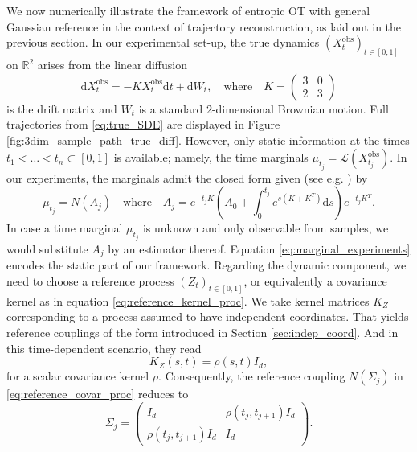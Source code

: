 \documentclass[]{article}
\newcommand{\diffd}{\mathrm{d}}
\DeclareMathOperator{\obs}{obs}
\numberwithin{equation}{section}
\theoremstyle{plain}
\begin{document}
{We now numerically illustrate the framework of entropic OT with general Gaussian reference in the context of trajectory reconstruction, as laid out in the previous section. In our experimental set-up, the true dynamics  $(X^{\obs}_t)_{t\in[0,1]}$ on $\mathbb R^2$ arises from the linear diffusion 
\begin{equation}\label{eq:true_SDE}
	\diffd X_t^{\obs} = -K X_t^{\obs}\diffd t +  \diffd W_t, \quad \text{where} \quad K = \begin{pmatrix}
		3 & 0 \\
		2 & 3
	\end{pmatrix} 
\end{equation}
is the drift matrix and $W_t$ is a standard $2$-dimensional Brownian motion. Full trajectories from \eqref{eq:true_SDE} are displayed in Figure \ref{fig:3dim_sample_path_true_diff}. However, only static information at the times $t_1 < \ldots < t_n \subset [0,1]$ is available; namely, the time marginals $\mu_{t_j} = \mathcal{L}(X_{t_j}^{\obs})$.
In our experiments, the marginals admit the closed form given (see e.g. \cite[Prop.~3.5]{pavliotis2014stochastic}) by 
\begin{equation}\label{eq:marginal_experiments}
 \mu_{t_j} = N(A_j) \quad \text{where} \quad A_j = e^{-t_j K}\left(A_0 + \int_0^{t_j} e^{s(K+K^T)} \diffd s\right) e^{-t_jK^T}.
\end{equation}
In case a time marginal $\mu_{t_j}$ is unknown and only observable from samples, we would substitute $A_j$ by an estimator thereof. 
Equation \eqref{eq:marginal_experiments} encodes the static part of our framework.
Regarding the dynamic component, we need to choose a reference process $(Z_t)_{t \in [0,1]}$, or equivalently a covariance kernel as in equation \eqref{eq:reference_kernel_proc}. We take kernel matrices $K_{Z}$ corresponding to a process assumed to have independent coordinates. That yields reference couplings of the form introduced in Section \ref{sec:indep_coord}. And in this time-dependent scenario, they read
\begin{equation}\label{eq:indep_coord_kernel}
	K_Z(s,t) = \rho(s,t)I_d,
\end{equation}
for a scalar covariance kernel $\rho$. Consequently, the reference coupling $N(\Sigma_j)$ in \eqref{eq:reference_covar_proc} reduces to 
\begin{equation*}
	\Sigma_j = \begin{pmatrix}
		I_d & \rho(t_j,t_{j+1})I_d \\
		\rho(t_j,t_{j+1})I_d & I_d
	\end{pmatrix}.
\end{equation*}

}
\end{document}
